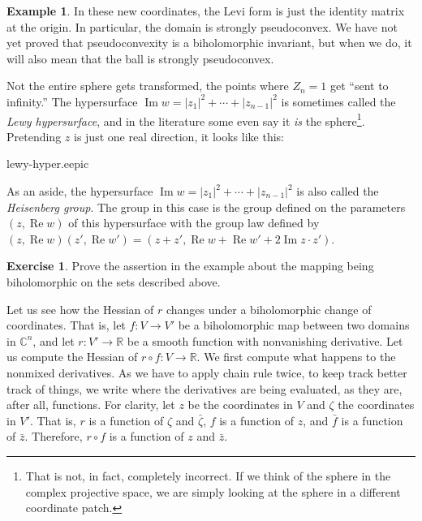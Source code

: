 \documentclass[12pt,openany]{book}
\renewcommand{\Re}{\operatorname{Re}}
\renewcommand{\Im}{\operatorname{Im}}
\newcommand{\sabs}[1]{\lvert {#1} \rvert}
\newcommand{\C}{{\mathbb{C}}}
\newcommand{\R}{{\mathbb{R}}}
\newcommand{\myindex}[1]{#1\index{#1}}
\theoremstyle{plain}
\theoremstyle{remark}
\theoremstyle{definition}
\newenvironment{exbox}{%
    \def\FrameCommand{\vrule width 1pt \relax\hspace{10pt}}%
    \MakeFramed {\advance \hsize -\width \FrameRestore}%
}{%
    \endMakeFramed
}
\newenvironment{myfig}{%
    \begin{center}
}{%
    \end{center}
}
\theoremstyle{exercise}
\newtheorem{exercise}{Exercise}[section]
\theoremstyle{example}
\newtheorem{example}[thm]{Example}
\begin{document}
\begin{example}
In these new coordinates, the Levi form is just the identity matrix at the
origin.  In particular, the domain is strongly pseudoconvex.
We have not yet proved that pseudoconvexity is a biholomorphic invariant,
but when we do, it will also mean that the ball is strongly pseudoconvex.

Not the entire sphere gets transformed, the points where $Z_n=1$
get ``sent to infinity.''
The hypersurface $\Im w = \sabs{z_1}^2 + \cdots + \sabs{z_{n-1}}^2$
is sometimes called the \emph{\myindex{Lewy hypersurface}}, and in the
literature some even say it \emph{is} the sphere\footnote{That is not, in
fact, completely incorrect.
If we think of the sphere in the complex projective space,
we are simply looking at the sphere in a different coordinate patch.}.
Pretending $z$ is just one real direction, it looks like this:

\begin{myfig}
{lewy-hyper.eepic}
\end{myfig}

As an aside,
the hypersurface 
$\Im w = \sabs{z_1}^2 + \cdots + \sabs{z_{n-1}}^2$ is also called the
\emph{\myindex{Heisenberg group}}.  The group in this case
is the group defined on the parameters $(z,\Re w)$ of this hypersurface with the
group law defined by $(z,\Re w)(z',\Re w') =
(z+z',\Re w + \Re w' + 2 \Im z \cdot z')$.
\end{example}

\begin{exbox}
\begin{exercise}
Prove the assertion in the example about the mapping being biholomorphic
on the sets described above.
\end{exercise}
\end{exbox}

Let us see how the Hessian of $r$ changes under a biholomorphic change
of coordinates.  That is, let $f \colon V \to V'$ be a biholomorphic map
between two domains in $\C^n$, and let $r \colon V' \to \R$ be a smooth
function with nonvanishing derivative.  Let us compute the Hessian of
$r \circ f \colon V \to \R$.
We first compute what happens to the nonmixed derivatives.
As we have to apply chain rule twice, to keep track better track of things,
we write where the derivatives are being evaluated, as they are, after all,
functions.
For clarity, let $z$ be the coordinates in $V$
and $\zeta$ the coordinates in $V'$.
That is, $r$ is a function of $\zeta$ and $\bar{\zeta}$,
$f$ is a function of $z$, and $\bar{f}$ is a function of $\bar{z}$.
Therefore, $r \circ f$ is a function of $z$ and $\bar{z}$.
\end{document}
